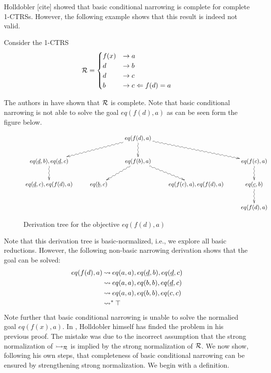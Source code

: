 Holldobler [cite] showed that basic conditional narrowing is complete for complete 1-CTRSs. However, the following example shows that this result is indeed not valid.

\begin{example}
    Consider the 1-CTRS
    \begin{displaymath}
        \mathcal{R} =
        \begin{cases}
            f(x) & \rightarrow a                               \\
            d & \rightarrow b \\
            d & \rightarrow c\\
            b & \rightarrow c \Leftarrow f(d) = a
        \end{cases}
    \end{displaymath}
\end{example}

The authors in \cite{Middeldorp1994} have shown that $\mathcal{R}$ is complete. Note that basic conditional narrowing is not able to solve the goal $eq(f(d),a)$ as can be seen form the figure below.

\begin{figure}[!ht]
    \begin{displaymath}
        \xymatrix{
            & & eq(f(d),a) \ar@{~>}[dll] \ar@{~>}[drr] \ar@{~>}[d] &  & \\
            eq(\underline{d},b),eq(\underline{d},c) \ar@{~>}[d] & & eq(f(b),a) \ar@{~>}[dl] \ar@{~>}[dr] & & eq(f(c),a) \ar@{~>}[d] \\
            eq(\underline{d},c), eq(f(d),a) &  eq(\underline{b},c) &  & eq(f(c),a), eq(f(d),a) & eq(\underline{c},b) \ar@{~>}[d]\\
            & & & & eq(f(d),a)
        }
    \end{displaymath}
    \caption{Derivation tree for the objective $eq(f(d),a)$}
    \label{figure:counterexample-basic-conditional-narrowing}
\end{figure}
Note that this derivation tree is basic-normalized, i.e., we explore all basic reductions. However, the following non-basic narrowing derivation shows that the goal can be solved:
\begin{align*}
    eq(f(d),a) &\mathbin{\rightsquigarrow} eq(a,a), eq(\underline{d},b), eq(\underline{d},c) \\
    & \mathbin{\rightsquigarrow} eq(a,a), eq(b,b), eq(\underline{d},c) \\
    & \mathbin{\rightsquigarrow} eq(a,a), eq(b,b), eq(c,c) \\
    & \mathbin{\rightsquigarrow}^* \top
\end{align*}
Note further that basic conditional narrowing is unable to solve the normalied goal $eq(f(x),a)$. In \cite{Middeldorp1994}, Holldobler himself has finded the problem in his previous proof. The mistake was due to the incorrect assumption that the strong normalization of $\rightarrowtail_{\mathcal{R}}$ is implied by the strong normalization of $\mathcal{R}$. We now show, following his own steps, that completeness of basic conditional narrowing can be ensured by strengthening strong normalization. We begin with a definition.

